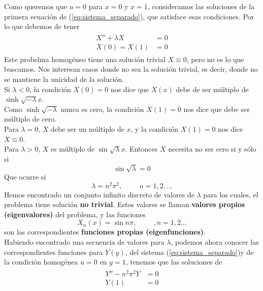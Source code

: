 Como queremos que $u=0$ para $x=0$ y $x=1$, consideramos las soluciones de la primera ecuación de (\ref{eq:sistema_separado}), que satisface esas condiciones. Por lo que debemos de tener
\begin{eqnarray}
\begin{aligned}
X'' + \lambda X &= 0 \\
X(0) = X(1) &= 0
\end{aligned}
\end{eqnarray}
Este probelma homogéneo tiene una solución trivial $X \equiv 0$, pero no es lo que buscamos. Nos interesan casos donde no sea la solución trivial, es decir, donde no se mantiene la unicidad de la solución.
\\
Si $\lambda < 0$, la condición $X(0) =0 $ nos dice que $X(x)$ debe de ser múltiplo de $\sinh \sqrt{-\lambda}x$.
\\
Como $\sinh \sqrt{-\lambda}$ nunca es cero, la condición $X(1)=0$ nos dice que debe ser múltiplo de cero.
\\
Para $\lambda=0$, $X$ debe ser un múltiplo de $x$, y la condición $X(1)=0$ nos dice $X \equiv 0$. \\
Para $\lambda>0$, $X$ es múltiplo de $\sin \sqrt{\lambda}x$. Entonces $X$ necesita no ser cero si y sólo si
\begin{equation}
\sin \sqrt{\lambda} = 0
\end{equation}
Que ocurre si
\begin{equation}
\lambda = n^{2} \pi^{2}, \hspace{1cm} n=1,2,\ldots
\end{equation}
Hemos encontrado un conjunto infinito discreto de valores de $\lambda$ para los cuales, el problema tiene solución \textbf{no trivial}. Estos valores se llaman \textbf{valores propios (eigenvalores)} del  problema, y las funciones
\begin{equation}
X_{n} (x) = \sin n \pi, \hspace{1cm}, n=1,2 \ldots
\end{equation}
son las correspondientes \textbf{funciones propias (eigenfunciones)}.
\\
Habiendo encontrado una secuencia de valores para $\lambda$, podemos ahora conocer las correspondientes funciones para $Y(y)$, del sistema (\ref{eq:sistema_separado})y de la condición homogénea $u=0$ en $y=1$, tenemos que las soluciones de 
\begin{eqnarray}
\begin{aligned}
Y'' - n^{2} \pi^{2} Y &= 0 \\
Y(1) &= 0
\end{aligned}
\end{eqnarray}

